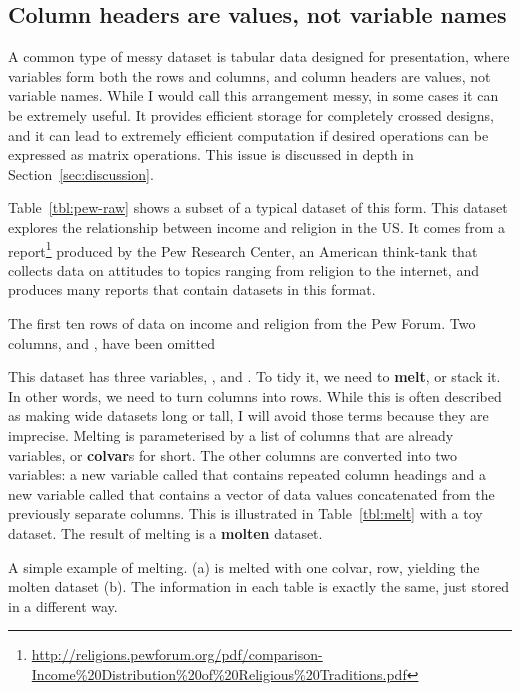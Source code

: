 \documentclass[article]{jss}
\begin{document}
\subsection{Column headers are values, not variable names}

A common type of messy dataset is tabular data designed for presentation, where variables form both the rows and columns, and column headers are values, not variable names. While I would call this arrangement messy, in some cases it can be extremely useful. It provides efficient storage for completely crossed designs, and it can lead to extremely efficient computation if desired operations can be expressed as matrix operations. This issue is discussed in depth in Section~\ref{sec:discussion}.

Table~\ref{tbl:pew-raw} shows a subset of a typical dataset of this form. This dataset explores the relationship between income and religion in the US. It comes from a report\footnote{\url{http://religions.pewforum.org/pdf/comparison-Income\%20Distribution\%20of\%20Religious\%20Traditions.pdf}} produced by the Pew Research Center, an American think-tank that collects data on attitudes to topics ranging from religion to the internet, and produces many reports that contain datasets in this format.

\begin{table}[htbp]
  \centering
  
  \caption{The first ten rows of data on income and religion from the Pew Forum. Two columns,  and , have been omitted} 
  \label{tbl:pew-raw}
\end{table}

This dataset has three variables, ,  and . To tidy it, we need to \textbf{melt}, or stack it. In other words, we need to turn columns into rows. While this is often described as making wide datasets long or tall, I will avoid those terms because they are imprecise. Melting is parameterised by a list of columns that are already variables, or \textbf{colvar}s for short. The other columns are converted into two variables: a new variable called  that contains repeated column headings and a new variable called  that contains a vector of data values concatenated from the previously separate columns. This is illustrated in Table~\ref{tbl:melt} with a toy dataset. The result of melting is a \textbf{molten} dataset.

\begin{table}
  \centering
  \hspace{2em}%

  \caption{A simple example of melting. (a) is melted with one colvar, row, yielding the molten dataset (b). The information in each table is exactly the same, just stored in a different way.}
  \label{tbl:melt} 
\end{table}
\end{document}
